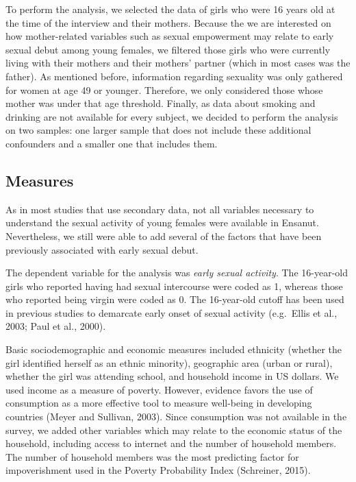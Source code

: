 \documentclass[
]{article}
\begin{document}
To perform the analysis, we selected the data of girls who were 16 years
old at the time of the interview and their mothers. Because the we are
interested on how mother-related variables such as sexual empowerment
may relate to early sexual debut among young females, we filtered those
girls who were currently living with their mothers and their mothers'
partner (which in most cases was the father). As mentioned before,
information regarding sexuality was only gathered for women at age 49 or
younger. Therefore, we only considered those whose mother was under that
age threshold. Finally, as data about smoking and drinking are not
available for every subject, we decided to perform the analysis on two
samples: one larger sample that does not include these additional
confounders and a smaller one that includes them.

\hypertarget{measures}{%
\subsection{Measures}\label{measures}}

As in most studies that use secondary data, not all variables necessary
to understand the sexual activity of young females were available in
Ensanut. Nevertheless, we still were able to add several of the factors
that have been previously associated with early sexual debut.

The dependent variable for the analysis was \emph{early sexual
activity}. The 16-year-old girls who reported having had sexual
intercourse were coded as 1, whereas those who reported being virgin
were coded as 0. The 16-year-old cutoff has been used in previous
studies to demarcate early onset of sexual activity (e.g.~Ellis et al.,
2003; Paul et al., 2000).

Basic sociodemographic and economic measures included ethnicity (whether
the girl identified herself as an ethnic minority), geographic area
(urban or rural), whether the girl was attending school, and household
income in US dollars. We used income as a measure of poverty. However,
evidence favors the use of consumption as a more effective tool to
measure well-being in developing countries (Meyer and Sullivan, 2003).
Since consumption was not available in the survey, we added other
variables which may relate to the economic status of the household,
including access to internet and the number of household members. The
number of household members was the most predicting factor for
impoverishment used in the Poverty Probability Index (Schreiner, 2015).
\end{document}
